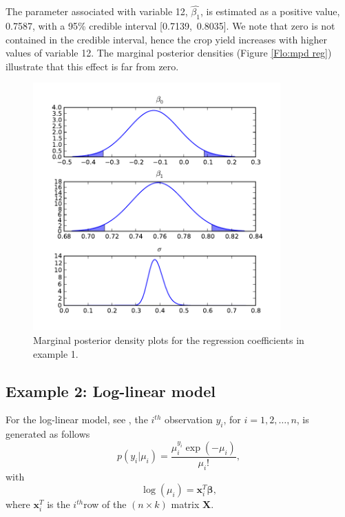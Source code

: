 \documentclass[article]{jss}
\begin{document}
The parameter associated with variable 12, $\hat{\beta_{1}}$, is
estimated as a positive value, 0.7587, with a 95\% credible interval
{[}0.7139,~0.8035{]}. We note that zero is not contained in the
credible interval, hence the crop yield increases with higher values
of variable 12. The marginal posterior densities (Figure \ref{Flo:mpd
  reg}) illustrate that this effect is far from zero. %

\begin{figure}[t!]
  \begin{center}
    \includegraphics[width=9.5cm]{mpdreg.pdf}
  \end{center}
\caption{Marginal posterior density plots for the regression coefficients in example 1.}
\label{Flo:mpd reg}
\end{figure}



\subsection{Example 2: Log-linear model}
\label{sub:Example-2:-Log-linear}

For the log-linear model, see \citet{GelmanCarlinSternRubin2004}, the
$i^{th}$ observation $y_{i}$, for $i=1,2,\dots,n$, is generated as
follows
\begin{equation}
  p(y_{i}|\mu_{i})=\frac{\mu_{i}^{y_{i}}\exp(-\mu_{i})}{\mu_{i}!},\label{eq:observation
    equation log linear model}
\end{equation} with \[
\log(\mu_{i})=\bm{x}_{i}^{T}\bm{\beta},\] where $\bm{x}_{i}^{T}$ is
the $i^{th}$row of the $\left(n\times k\right)$ matrix $\bm{X}.$
\end{document}
